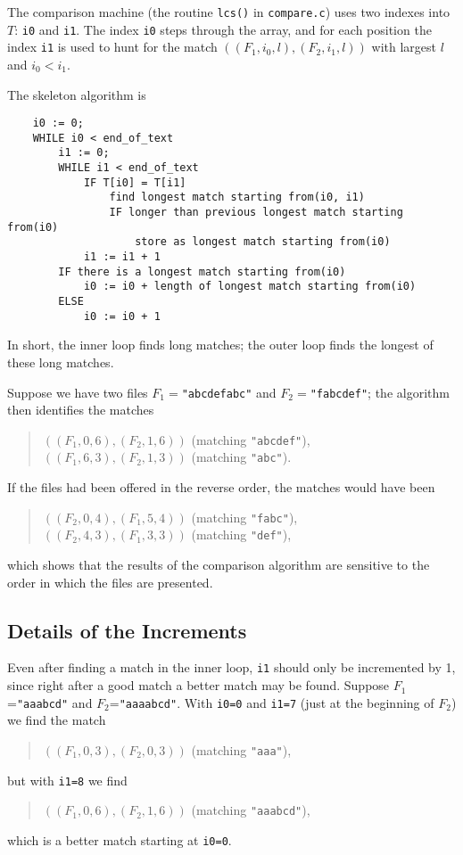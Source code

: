 \documentclass[a4paper,fleqn]{article}
\newcommand{\cw}[1]{\texttt{#1}}
\begin{document}
The comparison machine (the routine \cw{lcs()} in \cw{compare.c}) uses two
indexes into $T$: \cw{i0} and \cw{i1}.
The index \cw{i0} steps through the array, and for each position the
index \cw{i1} is used to hunt for the match
$((F_1, i_0, l), (F_2, i_1, l))$ with largest $l$ and $i_0 < i_1$.

The skeleton algorithm is

\small%
\begin{verbatim}
    i0 := 0;
    WHILE i0 < end_of_text
        i1 := 0;
        WHILE i1 < end_of_text
            IF T[i0] = T[i1]
                find longest match starting from(i0, i1)
                IF longer than previous longest match starting from(i0)
                    store as longest match starting from(i0)
            i1 := i1 + 1
        IF there is a longest match starting from(i0)
            i0 := i0 + length of longest match starting from(i0)
        ELSE
            i0 := i0 + 1
\end{verbatim}%
\normalsize%
\noindent
In short, the inner loop finds long matches; the outer loop finds the
longest of these long matches.

Suppose we have two files $F_1 = $\cw{"abcdefabc"} and
$F_2 = $\cw{"fabcdef"}; the algorithm then identifies the matches
\begin{quote}
$((F_1,0,6), (F_2,1,6))$ (matching \cw{"abcdef"}), \\
$((F_1,6,3), (F_2,1,3))$ (matching \cw{"abc"}).
\end{quote}
If the files had been offered in the reverse order, the matches would have
been
\begin{quote}
$((F_2,0,4), (F_1,5,4))$ (matching \cw{"fabc"}), \\
$((F_2,4,3), (F_1,3,3))$ (matching \cw{"def"}),
\end{quote}
which shows that the results of the comparison algorithm are sensitive to the
order in which the files are presented.

\subsection{Details of the Increments}

Even after finding a match in the inner loop, \cw{i1} should only be
incremented by 1, since right after a good match a better match may be found.
Suppose $F_1$=\cw{"aaabcd"} and $F_2$=\cw{"aaaabcd"}.
With \cw{i0=0} and \cw{i1=7} (just at the beginning of $F_2$) we find the
match
\begin{quote}
$((F_1,0,3), (F_2,0,3))$ (matching \cw{"aaa"}),
\end{quote}
but with \cw{i1=8} we find
\begin{quote}
$((F_1,0,6), (F_2,1,6))$ (matching \cw{"aaabcd"}),
\end{quote}
which is a better match starting at \cw{i0=0}.
\end{document}
